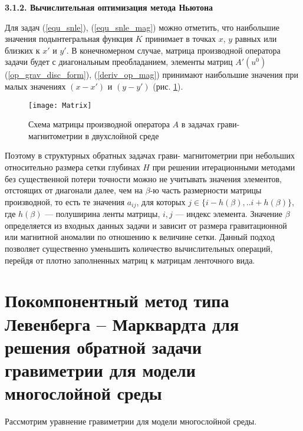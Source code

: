 \smallskip
{\bfseries 3.1.2. Вычислительная оптимизация метода Ньютона}

Для задач (\ref{equ_snle}), (\ref{equ_snle_mag}) можно отметить, что наибольшие значения подынтегральная функция $K$ принимает в точках $x$, $y$ равных или близких к $x'$ и $y'$. В конечномерном случае, матрица производной оператора задачи будет с диагональным преобладанием, элементы матриц $A'(u^0)$ (\ref{op_grav_disc_form}), (\ref{deriv_op_mag}) принимают наибольшие значения при малых значениях $(x-x')$ и $(y-y')$ (рис. \ref{fig:matrixscheme}).
\begin{figure}[H]
	\centering
	\texttt{[image: Matrix]}
	\caption{Схема матрицы производной оператора $A$ в задачах грави- магнитометрии в двухслойной среде}
	\label{fig:matrixscheme}
\end{figure}

Поэтому в структурных обратных задачах грави- магнитометрии при небольших относительно размера сетки глубинах $H$ при решении итерационными методами без существенной потери точности можно не учитывать значения элементов, отстоящих от диагонали далее, чем на  $\beta$-ю часть  размерности матрицы производной, то есть те значения $a_{ij}$, для которых  $j \in \{i-h(\beta),..i+h(\beta)\} $, где $h(\beta)$ --- полуширина ленты матрицы, $i, j$ --- индекс элемента. Значение $\beta$ определяется из входных данных задачи и зависит от размера гравитационной или магнитной аномалии по отношению к величине сетки. Данный подход позволяет существенно уменьшить количество вычислительных операций, перейдя от плотно заполненных матриц к матрицам ленточного вида.

\newpage
\section{Покомпонентный метод типа Левенберга -- Марквардта для решения обратной задачи гравиметрии для модели многослойной среды}

Рассмотрим уравнение гравиметрии для модели многослойной среды. 

